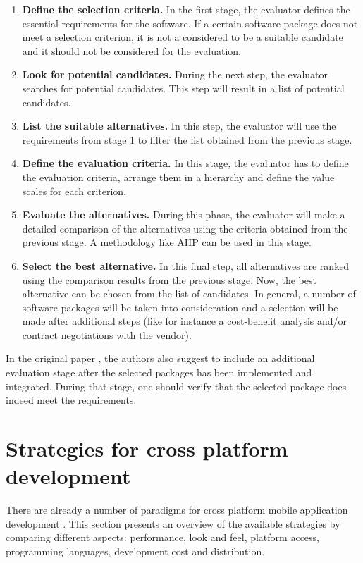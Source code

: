 \begin{enumerate}
    \item \textbf{Define the selection criteria.} In the first stage, the evaluator defines the essential requirements for the software. If a certain software package does not meet a selection criterion, it is not a considered to be a suitable candidate and it should not be considered for the evaluation. 
    \item \textbf{Look for potential candidates.} During the next step, the evaluator searches for potential candidates. This step will result in a list of potential candidates.
    \item \textbf{List the suitable alternatives.} In this step, the evaluator will use the requirements from stage 1 to filter the list obtained from the previous stage. 
    \item \textbf{Define the evaluation criteria.} In this stage, the evaluator has to define the evaluation criteria, arrange them in a hierarchy and define the value scales for each criterion. 
    \item \textbf{Evaluate the alternatives.} During this phase, the evaluator will make a detailed comparison of the alternatives using the criteria obtained from the previous stage. A methodology like AHP can be used in this stage.
    \item \textbf{Select the best alternative.} In this final step, all alternatives are ranked using the comparison results from the previous stage. Now, the best alternative can be chosen from the list of candidates. In general, a number of software packages will be taken into consideration and a selection will be made after additional steps (like for instance a cost-benefit analysis and/or contract negotiations with the vendor). 
\end{enumerate}

In the original paper \cite{Jadhav:2009}, the authors also suggest to include an additional evaluation stage after the selected packages has been implemented and integrated. During that stage, one should verify that the selected package does indeed meet the requirements.

\section{Strategies for cross platform development}

There are already a number of paradigms for cross platform mobile application development \citep{Friese}. This section presents an overview of the available strategies by comparing different aspects: performance, look and feel, platform access, programming languages, development cost and distribution.

